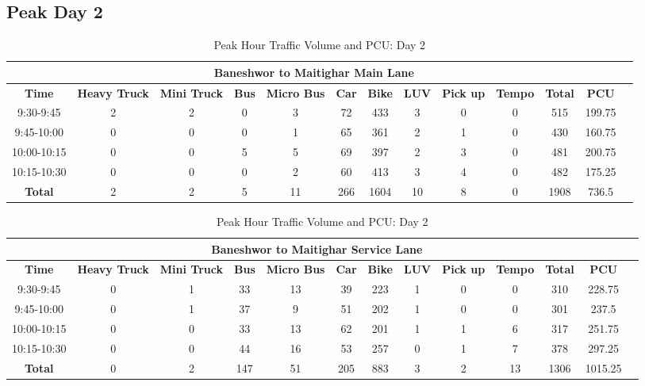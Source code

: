\begin{landscape}
\section{Peak Day 2}
\vspace{0.5cm}
\begin{table}[h!]
\caption{Peak Hour Traffic Volume and PCU: Day 2}
\begin{tabular}{|c|c|c|c|c|c|c|c|c|c|c|c|c|}
    \hline
    \multicolumn{12}{|c|}{\textbf{Baneshwor to Maitighar Main Lane}} \\
    \hline
    \textbf{Time} & \textbf{Heavy Truck} & \textbf{Mini Truck} & \textbf{Bus} & \textbf{Micro Bus} & \textbf{Car} & \textbf{Bike} & \textbf{LUV} & \textbf{Pick up} & \textbf{Tempo} & \textbf{\textbf{Total}} & \textbf{PCU} \\
    \hline
    9:30-9:45	&2	&2	&0	&3	&72	&433	&3	&0	&0	&515	&199.75 \\ \hline
    9:45-10:00	&0	&0	&0	&1	&65	&361	&2	&1	&0	&430	&160.75 \\ \hline
    10:00-10:15	&0	&0	&5	&5	&69	&397	&2	&3	&0	&481	&200.75 \\ \hline
    10:15-10:30	&0	&0	&0	&2	&60	&413	&3	&4	&0	&482	&175.25 \\ \hline
    \textbf{Total} & 2 & 2 & 5 & 11 & 266 & 1604 & 10 & 8 & 0 & 1908 & 736.5 \\ \hline
\end{tabular}

\vspace{0.5cm}
\begin{tabular}{|c|c|c|c|c|c|c|c|c|c|c|c|c|}
    \hline
    \multicolumn{12}{|c|}{\textbf{Baneshwor to Maitighar Service Lane}} \\
    \hline
    \textbf{Time} & \textbf{Heavy Truck} & \textbf{Mini Truck} & \textbf{Bus} & \textbf{Micro Bus} & \textbf{Car} & \textbf{Bike} & \textbf{LUV} & \textbf{Pick up} & \textbf{Tempo} & \textbf{\textbf{Total}} & \textbf{PCU} \\
    \hline
    9:30-9:45	&0	&1	&33	&13	&39	&223	&1	&0	&0	&310	&228.75 \\ \hline
    9:45-10:00	&0	&1	&37	&9	&51	&202	&1	&0	&0	&301	&237.5 \\ \hline
    10:00-10:15	&0	&0	&33	&13	&62	&201	&1	&1	&6	&317	&251.75 \\ \hline
    10:15-10:30	&0	&0	&44	&16	&53	&257	&0	&1	&7	&378	&297.25 \\ \hline
    \textbf{Total} & 0 & 2 & 147 & 51 & 205 & 883 & 3 & 2 & 13 & 1306 & 1015.25 \\ \hline
\end{tabular}

\end{table}
\end{landscape}

